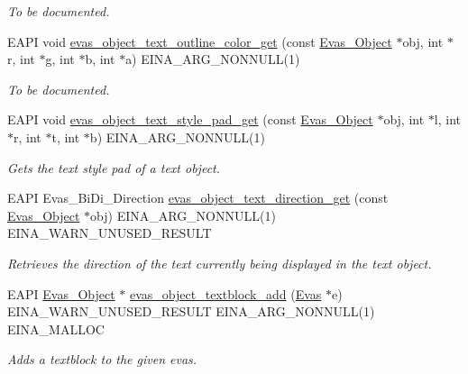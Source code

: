 \begin{DoxyCompactItemize}
\begin{DoxyCompactList}\small\item\em To be documented. \item\end{DoxyCompactList}\item 
EAPI void \hyperlink{group__Evas__Object__Text_ga16485a0062a397faed21fad732ad16ba}{evas\_\-object\_\-text\_\-outline\_\-color\_\-get} (const \hyperlink{group__Evas__Object__Group_ga9e19e6dd1f517a0ba437c0114d3e7c97}{Evas\_\-Object} $\ast$obj, int $\ast$r, int $\ast$g, int $\ast$b, int $\ast$a) EINA\_\-ARG\_\-NONNULL(1)
\begin{DoxyCompactList}\small\item\em To be documented. \item\end{DoxyCompactList}\item 
EAPI void \hyperlink{group__Evas__Object__Text_gafd638ae91c10d4139e41e6245c0712e1}{evas\_\-object\_\-text\_\-style\_\-pad\_\-get} (const \hyperlink{group__Evas__Object__Group_ga9e19e6dd1f517a0ba437c0114d3e7c97}{Evas\_\-Object} $\ast$obj, int $\ast$l, int $\ast$r, int $\ast$t, int $\ast$b) EINA\_\-ARG\_\-NONNULL(1)
\begin{DoxyCompactList}\small\item\em Gets the text style pad of a text object. \item\end{DoxyCompactList}\item 
EAPI Evas\_\-BiDi\_\-Direction \hyperlink{group__Evas__Object__Text_ga2fdb3ff0318cd4b45d642ae317b19589}{evas\_\-object\_\-text\_\-direction\_\-get} (const \hyperlink{group__Evas__Object__Group_ga9e19e6dd1f517a0ba437c0114d3e7c97}{Evas\_\-Object} $\ast$obj) EINA\_\-ARG\_\-NONNULL(1) EINA\_\-WARN\_\-UNUSED\_\-RESULT
\begin{DoxyCompactList}\small\item\em Retrieves the direction of the text currently being displayed in the text object. \item\end{DoxyCompactList}\item 
EAPI \hyperlink{group__Evas__Object__Group_ga9e19e6dd1f517a0ba437c0114d3e7c97}{Evas\_\-Object} $\ast$ \hyperlink{group__Evas__Object__Textblock_gac43a253bc767da912ee1818a8dfa5713}{evas\_\-object\_\-textblock\_\-add} (\hyperlink{group__Evas__Canvas_ga5ff87cc4ce6bc43e3b640a6d37f73043}{Evas} $\ast$e) EINA\_\-WARN\_\-UNUSED\_\-RESULT EINA\_\-ARG\_\-NONNULL(1) EINA\_\-MALLOC
\begin{DoxyCompactList}\small\item\em Adds a textblock to the given evas. \item\end{DoxyCompactList}\item 

\end{DoxyCompactItemize}
